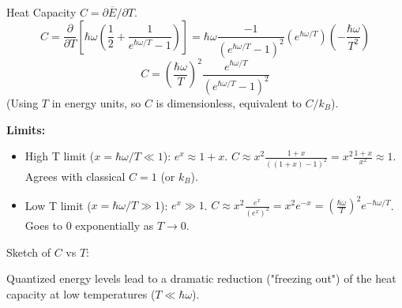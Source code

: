 \documentclass[11pt]{article}
\newcommand{\avg}[1]{\overline{#1}}
\newcommand{\pderiv}[2]{\frac{\partial #1}{\partial #2}}
\newcommand{\kb}{k_B} %
\begin{document}
Heat Capacity $C = \partial \avg{E} / \partial T$.
\[ C = \pderiv{}{T} \left[ \hbar\omega \left( \frac{1}{2} + \frac{1}{e^{\hbar\omega/T} - 1} \right) \right] = \hbar\omega \frac{-1}{(e^{\hbar\omega/T} - 1)^2} \left( e^{\hbar\omega/T} \right) \left( -\frac{\hbar\omega}{T^2} \right) \]
\[ C = \left( \frac{\hbar\omega}{T} \right)^2 \frac{e^{\hbar\omega/T}}{(e^{\hbar\omega/T} - 1)^2} \]
(Using $T$ in energy units, so $C$ is dimensionless, equivalent to $C/\kb$).

\textbf{Limits:}
\begin{itemize}
    \item High T limit ($x = \hbar\omega/T \ll 1$): $e^x \approx 1+x$. $C \approx x^2 \frac{1+x}{((1+x)-1)^2} = x^2 \frac{1+x}{x^2} \approx 1$. Agrees with classical $C=1$ (or $\kb$).
    \item Low T limit ($x = \hbar\omega/T \gg 1$): $e^x \gg 1$. $C \approx x^2 \frac{e^x}{(e^x)^2} = x^2 e^{-x} = (\frac{\hbar\omega}{T})^2 e^{-\hbar\omega/T}$. Goes to 0 exponentially as $T \to 0$.
\end{itemize}

Sketch of $C$ vs $T$:
\begin{center}
\end{center}
Quantized energy levels lead to a dramatic reduction ("freezing out") of the heat capacity at low temperatures ($T \ll \hbar\omega$).
\end{document}
